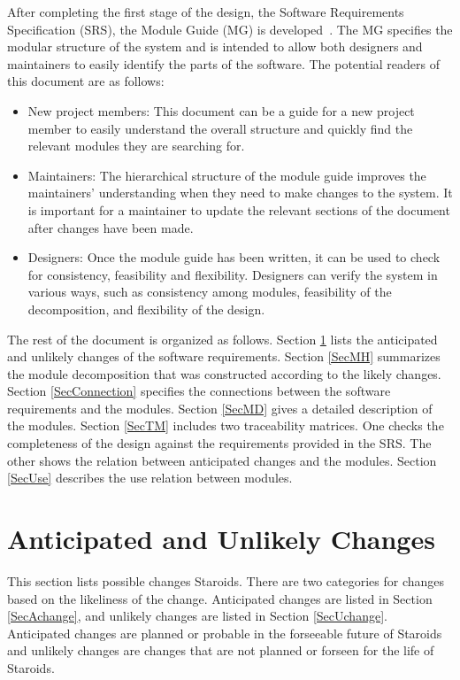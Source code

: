 \documentclass[12pt, titlepage]{article}
\begin{document}
After completing the first stage of the design, the Software Requirements Specification (SRS), the Module Guide (MG) is developed~\citep{ParnasEtAl1984}. The MG specifies the modular structure of the system and is intended to allow both designers and maintainers to easily identify the parts of the software.  The potential readers of this document are as follows:

\begin{itemize}
\item New project members: This document can be a guide for a new project member to easily understand the overall structure and quickly find the relevant modules they are searching for.
\item Maintainers: The hierarchical structure of the module guide improves the maintainers' understanding when they need to make changes to the system. It is important for a maintainer to update the relevant sections of the document after changes have been made.
\item Designers: Once the module guide has been written, it can be used to check for consistency, feasibility and flexibility. Designers can verify the system in various ways, such as consistency among modules, feasibility of the decomposition, and flexibility of the design.
\end{itemize}

The rest of the document is organized as follows. Section
\ref{SecChange} lists the anticipated and unlikely changes of the software requirements. Section \ref{SecMH} summarizes the module decomposition that was constructed according to the likely changes. Section \ref{SecConnection} specifies the connections between the software requirements and the modules. Section \ref{SecMD} gives a detailed description of the modules. Section \ref{SecTM} includes two traceability matrices. One checks the completeness of the design against the requirements provided in the SRS. The other shows the relation between anticipated changes and the modules. Section
\ref{SecUse} describes the use relation between modules.

\section{Anticipated and Unlikely Changes} \label{SecChange}

This section lists possible changes Staroids. There are two categories for changes based on the likeliness of the change. Anticipated changes are listed in Section \ref{SecAchange}, and unlikely changes are listed in Section \ref{SecUchange}. Anticipated changes are planned or probable in the forseeable future of Staroids and unlikely changes are changes that are not planned or forseen for the life of Staroids.
\end{document}

